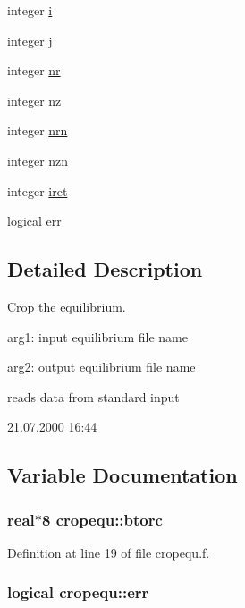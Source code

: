 \begin{CompactItemize}
integer \hyperlink{namespacecropequ_29c60057cd3ac46029ead264faa6e632}{i}
\item 
integer \hyperlink{namespacecropequ_91eff21312f6ddff6f7faf416d09a8a5}{j}
\item 
integer \hyperlink{namespacecropequ_27fba5a93cdc5a7654bdf5667c178b15}{nr}
\item 
integer \hyperlink{namespacecropequ_ffd518930bd0631a6a50368c71e950b4}{nz}
\item 
integer \hyperlink{namespacecropequ_8343e4bb7153d2e5b304f677249a514a}{nrn}
\item 
integer \hyperlink{namespacecropequ_d9c10ef53d2478403af28fcbabddebaa}{nzn}
\item 
integer \hyperlink{namespacecropequ_f6dbf4b8794c7af19a050269451861e5}{iret}
\item 
logical \hyperlink{namespacecropequ_a9edc1a57af22096446e628df43d5388}{err}
\end{CompactItemize}


\subsection{Detailed Description}
Crop the equilibrium. 

arg1: input equilibrium file name

arg2: output equilibrium file name

reads data from standard input

\begin{Desc}
\item[Version:]21.07.2000 16:44 \end{Desc}


\subsection{Variable Documentation}
\hypertarget{namespacecropequ_2fa7545a4a2d563a0df549f2a29ad11f}{
\subsubsection[btorc]{\setlength{\rightskip}{0pt plus 5cm}real$\ast$8 {\bf cropequ::btorc}}}
\label{namespacecropequ_2fa7545a4a2d563a0df549f2a29ad11f}




Definition at line 19 of file cropequ.f.\hypertarget{namespacecropequ_a9edc1a57af22096446e628df43d5388}{
\subsubsection[err]{\setlength{\rightskip}{0pt plus 5cm}logical {\bf cropequ::err}}}
\label{namespacecropequ_a9edc1a57af22096446e628df43d5388}




